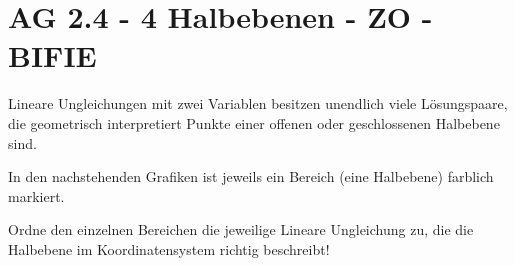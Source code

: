 \section{AG 2.4 - 4 Halbebenen - ZO - BIFIE}

\begin{beispiel}[AG 2.4]{1} %
	Lineare Ungleichungen mit zwei Variablen besitzen unendlich viele Lösungspaare, die geometrisch interpretiert Punkte einer offenen oder geschlossenen Halbebene sind.
	
In den nachstehenden Grafiken ist jeweils ein Bereich (eine Halbebene) farblich markiert. 

\leer

Ordne den einzelnen Bereichen die jeweilige Lineare Ungleichung zu, die die Halbebene im Koordinatensystem richtig beschreibt!


\end{beispiel}
